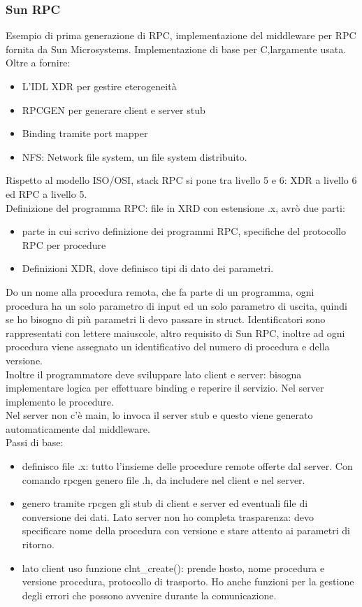 \documentclass[16px]{article}
\begin{document}
\subsubsection{Sun RPC}
Esempio di prima generazione di RPC, implementazione del middleware per RPC fornita da Sun Microsystems. Implementazione di base per C,largamente usata. Oltre a fornire:
\begin{itemize}
\item L'IDL XDR per gestire eterogeneità
\item RPCGEN per generare client e server stub
\item Binding tramite port mapper
\item NFS: Network file system, un file system distribuito.
\end{itemize}
Rispetto al modello ISO/OSI, stack RPC si pone tra livello 5 e 6: XDR  a livello 6 ed RPC a livello 5.\\ Definizione del programma RPC:
file in XRD con estensione .x, avrò due parti:
\begin{itemize}
\item parte in cui scrivo definizione dei programmi RPC, specifiche del protocollo RPC per procedure
\item Definizioni XDR, dove definisco tipi di dato dei parametri.
\end{itemize}
Do un nome alla procedura remota, che fa parte di un programma, ogni procedura ha un solo parametro di input ed un solo parametro di uscita, quindi se ho bisogno di più parametri li devo passare in struct. Identificatori sono rappresentati con lettere maiuscole, altro requisito di Sun RPC, inoltre ad ogni procedura viene assegnato un identificativo del numero di procedura e della versione.\\ Inoltre il programmatore deve sviluppare lato client e server: bisogna implementare logica per effettuare binding e reperire il servizio. Nel server implemento le procedure.\\Nel server non c'è main, lo invoca il server stub e questo viene generato automaticamente dal middleware.
\\Passi di base:
\begin{itemize}
\item definisco file .x: tutto l'insieme delle procedure remote offerte dal server. Con comando rpcgen genero file .h, da includere nel client e nel server.
\item genero tramite rpcgen gli stub di client e server ed eventuali file di conversione dei dati. Lato server non ho completa trasparenza: devo specificare nome della procedura con versione e stare attento ai parametri di ritorno.
\item lato client uso funzione clnt\_create(): prende hosto, nome procedura e versione procedura, protocollo di trasporto. Ho anche funzioni per la gestione degli errori che possono avvenire durante la comunicazione.
\end{itemize}
\end{document}
